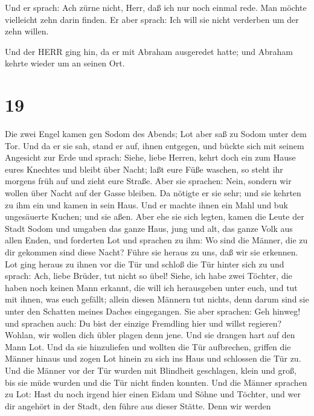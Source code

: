  Und er sprach: Ach zürne nicht, Herr, daß ich nur noch
einmal rede. Man möchte vielleicht zehn darin finden. Er aber sprach:
Ich will sie nicht verderben um der zehn willen.

 Und der HERR ging hin, da er mit Abraham ausgeredet hatte;
und Abraham kehrte wieder um an seinen Ort.

\hypertarget{section-18}{%
\section{19}\label{section-18}}

 Die zwei Engel kamen gen Sodom des Abends; Lot aber saß zu
Sodom unter dem Tor. Und da er sie sah, stand er auf, ihnen entgegen,
und bückte sich mit seinem Angesicht zur Erde  und sprach:
Siehe, liebe Herren, kehrt doch ein zum Hause eures Knechtes und bleibt
über Nacht; laßt eure Füße waschen, so steht ihr morgens früh auf und
zieht eure Straße. Aber sie sprachen: Nein, sondern wir wollen über
Nacht auf der Gasse bleiben.  Da nötigte er sie sehr; und
sie kehrten zu ihm ein und kamen in sein Haus. Und er machte ihnen ein
Mahl und buk ungesäuerte Kuchen; und sie aßen.  Aber ehe sie
sich legten, kamen die Leute der Stadt Sodom und umgaben das ganze Haus,
jung und alt, das ganze Volk aus allen Enden,  und forderten
Lot und sprachen zu ihm: Wo sind die Männer, die zu dir gekommen sind
diese Nacht? Führe sie heraus zu uns, daß wir sie erkennen. 
Lot ging heraus zu ihnen vor die Tür und schloß die Tür hinter sich zu
 und sprach: Ach, liebe Brüder, tut nicht so übel!
 Siehe, ich habe zwei Töchter, die haben noch keinen Mann
erkannt, die will ich herausgeben unter euch, und tut mit ihnen, was
euch gefällt; allein diesen Männern tut nichts, denn darum sind sie
unter den Schatten meines Daches eingegangen.  Sie aber
sprachen: Geh hinweg! und sprachen auch: Du bist der einzige Fremdling
hier und willst regieren? Wohlan, wir wollen dich übler plagen denn
jene. Und sie drangen hart auf den Mann Lot. Und da sie hinzuliefen und
wollten die Tür aufbrechen,  griffen die Männer hinaus und
zogen Lot hinein zu sich ins Haus und schlossen die Tür zu.
 Und die Männer vor der Tür wurden mit Blindheit
geschlagen, klein und groß, bis sie müde wurden und die Tür nicht finden
konnten.  Und die Männer sprachen zu Lot: Hast du noch
irgend hier einen Eidam und Söhne und Töchter, und wer dir angehört in
der Stadt, den führe aus dieser Stätte.  Denn wir werden
